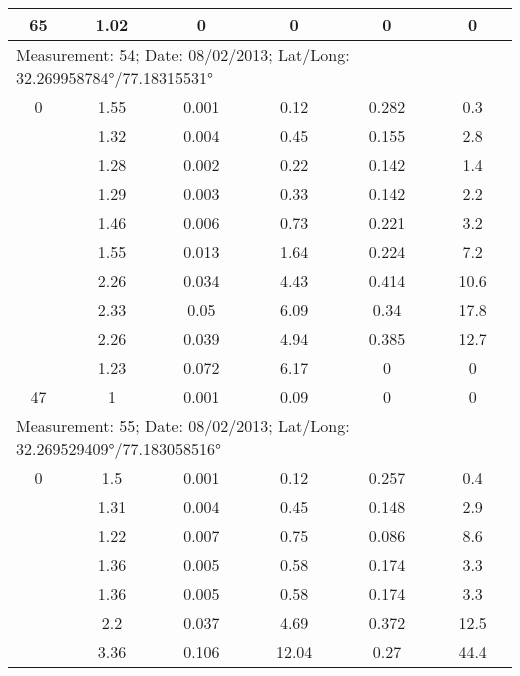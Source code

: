 \begin{longtable}{cccccc}
		65    & 1.02  & 0     & 0     & 0     & 0 \\
		\midrule
		\multicolumn{6}{l}{Measurement: 54; Date: 08/02/2013;
			Lat/Long: 32.269958784°/77.18315531°} \\		
		\midrule
		0     & 1.55  & 0.001 & 0.12  & 0.282 & 0.3 \\
		
		& 1.32  & 0.004 & 0.45  & 0.155 & 2.8 \\
		
		& 1.28  & 0.002 & 0.22  & 0.142 & 1.4 \\
		
		& 1.29  & 0.003 & 0.33  & 0.142 & 2.2 \\
		
		& 1.46  & 0.006 & 0.73  & 0.221 & 3.2 \\
		
		& 1.55  & 0.013 & 1.64  & 0.224 & 7.2 \\
		
		& 2.26  & 0.034 & 4.43  & 0.414 & 10.6 \\
		
		& 2.33  & 0.05  & 6.09  & 0.34  & 17.8 \\
		
		& 2.26  & 0.039 & 4.94  & 0.385 & 12.7 \\
		
		& 1.23  & 0.072 & 6.17  & 0     & 0 \\
		
		47    & 1     & 0.001 & 0.09  & 0     & 0 \\
		\midrule
		\multicolumn{6}{l}{Measurement: 55; Date: 08/02/2013;
			Lat/Long: 32.269529409°/77.183058516°} \\		
		\midrule
		0     & 1.5   & 0.001 & 0.12  & 0.257 & 0.4 \\
		
		& 1.31  & 0.004 & 0.45  & 0.148 & 2.9 \\
		
		& 1.22  & 0.007 & 0.75  & 0.086 & 8.6 \\
		
		& 1.36  & 0.005 & 0.58  & 0.174 & 3.3 \\
		
		& 1.36  & 0.005 & 0.58  & 0.174 & 3.3 \\
		
		& 2.2   & 0.037 & 4.69  & 0.372 & 12.5 \\
		
		& 3.36  & 0.106 & 12.04 & 0.27  & 44.4 \\
		

\end{longtable}

